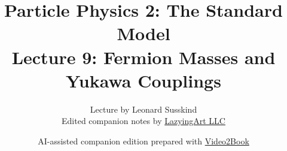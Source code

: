 \documentclass[11pt,oneside]{book}
\begin{document}
\frontmatter
\title{Particle Physics 2: The Standard Model\\Lecture 9: Fermion Masses and Yukawa Couplings}
\author{Lecture by Leonard Susskind\\Edited companion notes by \href{https://lazying.art}{LazyingArt LLC}}
\date{AI-assisted companion edition prepared with \href{https://github.com/lachlanchen/Video2Book}{Video2Book}}
\maketitle
\mainmatter

\end{document}

